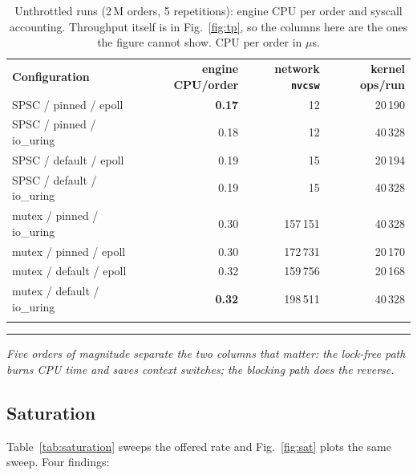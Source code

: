 \documentclass[conference]{IEEEtran}
\newcommand{\reading}[1]{%
  \par\vspace{1pt}\noindent
  \textcolor{corange}{\rule[-0.2ex]{2.2pt}{1.05em}}\hspace{3pt}%
  \textit{\textcolor{cgray}{#1}}\par\vspace{2pt}}
\begin{document}
\begin{table}[!t]
\centering
\caption{Unthrottled runs (2\,M orders, 5 repetitions): engine CPU per order and
syscall accounting. Throughput itself is in Fig.~\ref{fig:tp}, so the columns
here are the ones the figure cannot show. CPU per order in $\mu$s.}
\label{tab:throughput}
\small
\setlength{\tabcolsep}{9pt}
\begin{tabular}{@{}lrrr@{}}
\arrayrulecolor{cblue}\toprule
\rowcolor{cblueL}\textbf{Configuration} & \textbf{engine CPU/order} & \textbf{network \texttt{nvcsw}} & \textbf{kernel ops/run} \\
\arrayrulecolor{cblue!45}\midrule
\rowcolor{cblueL!55}SPSC / pinned / epoll     & \textbf{0.17} & 12 & 20\,190 \\
\rowcolor{cblueL!55}SPSC / pinned / io\_uring & 0.18 & 12 & 40\,328 \\
\rowcolor{cblueL!55}SPSC / default / epoll    & 0.19 & 15 & 20\,194 \\
\rowcolor{cblueL!55}SPSC / default / io\_uring& 0.19 & 15 & 40\,328 \\
\arrayrulecolor{corange!45}\midrule
\rowcolor{corangeL!70}mutex / pinned / io\_uring& 0.30 & \textcolor{cred}{157\,151} & 40\,328 \\
\rowcolor{corangeL!70}mutex / pinned / epoll    & 0.30 & \textcolor{cred}{172\,731} & 20\,170 \\
\rowcolor{corangeL!70}mutex / default / epoll   & 0.32 & \textcolor{cred}{159\,756} & 20\,168 \\
\rowcolor{corangeL!70}mutex / default / io\_uring & \textbf{0.32} & \textcolor{cred}{198\,511} & 40\,328 \\
\arrayrulecolor{cblue}\bottomrule
\end{tabular}
\end{table}

\reading{Five orders of magnitude separate the two columns that matter: the
lock-free path burns CPU time and saves context switches; the blocking path does
the reverse.}

\subsection{Saturation}
\label{sec:sat}
Table~\ref{tab:saturation} sweeps the offered rate and Fig.~\ref{fig:sat} plots
the same sweep. Four findings:
\end{document}
